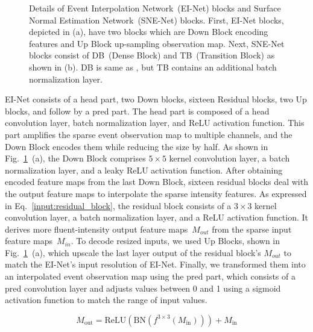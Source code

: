 \documentclass[preprint,12pt,authoryear]{elsarticle}
\begin{document}
\begin{figure}[t]
    \centering
    \caption{Details of Event Interpolation Network~(EI-Net) blocks and Surface Normal Estimation Network~(SNE-Net) blocks. First, EI-Net blocks, depicted in (a), have two blocks which are Down Block encoding features and Up Block up-sampling observation map. Next, SNE-Net blocks consist of DB~(Dense Block) and TB~(Transition Block) as shown in (b). DB is same as \citep{logothetis2021px}, but TB contains an additional batch normalization layer.}
    \label{fig:blocks}
\end{figure}

EI-Net consists of a head part, two Down blocks, sixteen Residual blocks, two Up blocks, and follow by a pred part.
The head part is composed of a head convolution layer, batch normalization layer, and ReLU activation function.
This part amplifies the sparse event observation map to multiple channels, and the Down Block encodes them while reducing the size by half.
As shown in Fig.~\ref{fig:blocks}~(a), the Down Block comprises $5\times5$ kernel convolution layer, a batch normalization layer, and a leaky ReLU activation function.
After obtaining encoded feature maps from the last Down Block, sixteen residual blocks deal with the output feature maps to interpolate the sparse intensity features.
As expressed in Eq.~\ref{input:residual_block}, the residual block consists of a $3\times3$ kernel convolution layer, a batch normalization layer, and a ReLU activation function.
It derives more fluent-intensity output feature maps~$M_{out}$ from the sparse input feature maps~$M_{in}$.
To decode resized inputs, we used Up Blocks, shown in Fig.~\ref{fig:blocks}~(a), which upscale the last layer output of the residual block's $M_{out}$ to match the EI-Net's input resolution of EI-Net.
Finally, we transformed them into an interpolated event observation map using the pred part, which consists of a pred convolution layer and adjusts values between 0 and 1 using a sigmoid activation function to match the range of input values.

\begin{equation}
M_\text{out} = \text{ReLU}(\text{BN}(f^{3 \times 3}(M_\text{in}))) + M_\text{in}
\label{input:residual_block}
\end{equation}
\end{document}
